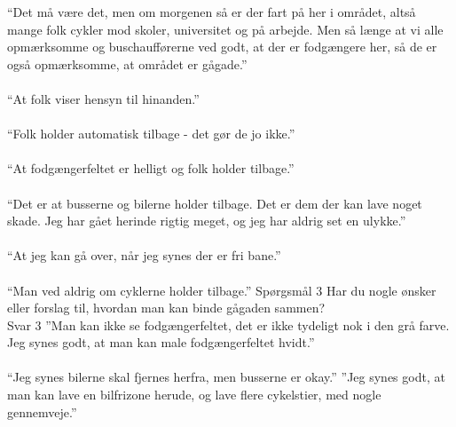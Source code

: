  “Det må være det, men om morgenen så er der fart på her i området, altså mange folk cykler mod skoler, universitet og på arbejde. Men så længe at vi alle opmærksomme og buschaufførerne ved godt, at der er fodgængere her, så de er også opmærksomme, at området er gågade.”
\\\\
  “At folk viser hensyn til hinanden.”
\\\\
  “Folk holder automatisk tilbage - det gør de jo ikke.”
\\\\
  “At fodgængerfeltet er helligt og folk holder tilbage.”
\\\\
  “Det er at busserne og bilerne holder tilbage. Det er dem der kan lave noget skade. Jeg har gået herinde rigtig meget, og jeg har aldrig set en ulykke.”
\\\\
  “At jeg kan gå over, når jeg synes der er fri bane.”
\\\\
  “Man ved aldrig om cyklerne holder tilbage.”
  Spørgsmål 3
  Har du nogle ønsker eller forslag til, hvordan man kan binde gågaden sammen?
\\
  Svar 3
  ”Man kan ikke se fodgængerfeltet, det er ikke tydeligt nok i den grå farve. Jeg synes godt, at man kan male fodgængerfeltet hvidt.”
\\\\
  “Jeg synes bilerne skal fjernes herfra, men busserne er okay.”
  ”Jeg synes godt, at man kan lave en bilfrizone herude, og lave flere cykelstier, med nogle gennemveje.”
\\\\

